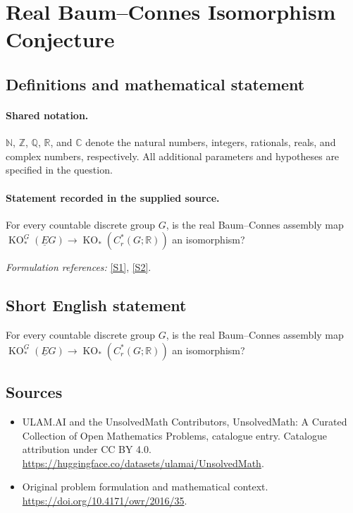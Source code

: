\documentclass[11pt]{article}
\newcommand{\sref}[2]{\hyperlink{source:#1:#2}{[S#2]}}
\begin{document}
\section{Real Baum–Connes Isomorphism Conjecture}\label{statement}

\subsection{Definitions and mathematical statement}

\paragraph{Shared notation.}$\mathbb N$, $\mathbb Z$, $\mathbb Q$, $\mathbb R$, and $\mathbb C$ denote the natural numbers, integers, rationals, reals, and complex numbers, respectively. All additional parameters and hypotheses are specified in the question.


\paragraph{Statement recorded in the supplied source.}
For every countable discrete group $G$, is the real Baum–Connes assembly map $\operatorname{KO}_*^G(\underline EG)\to \operatorname{KO}_*(C_r^*(G;\mathbb R))$ an isomorphism?
\par\smallskip\textit{Formulation references:} \sref{statement}{1}, \sref{statement}{2}.
\subsection{Short English statement}
For every countable discrete group $G$, is the real Baum–Connes assembly map $\operatorname{KO}_*^G(\underline EG)\to \operatorname{KO}_*(C_r^*(G;\mathbb R))$ an isomorphism?
\subsection{Sources}
\begin{itemize}
\item[\hypertarget{source:statement:1}{S1}] ULAM.AI and the UnsolvedMath Contributors, UnsolvedMath: A Curated Collection of Open Mathematics Problems, catalogue entry. Catalogue attribution under CC BY 4.0.
\url{https://huggingface.co/datasets/ulamai/UnsolvedMath}.
\item[\hypertarget{source:statement:2}{S2}] Original problem formulation and mathematical context.
\url{https://doi.org/10.4171/owr/2016/35}.
\end{itemize}
\label{end:statement}
\end{document}
